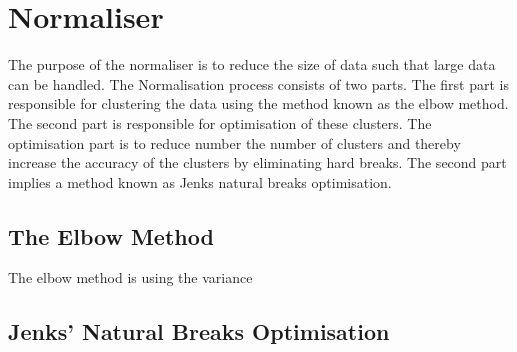 \section{Normaliser}
\label{sec:normaliser}
The purpose of the normaliser is to reduce the size of data such that large data can be handled. The Normalisation process consists of two parts. The first part is responsible for clustering the data using the method known as the elbow method. The second part is responsible for optimisation of these clusters. The optimisation part is to reduce number the number of clusters and thereby increase the accuracy of the clusters by eliminating hard breaks. The second part implies a method known as Jenks natural breaks optimisation.

\subsection{The Elbow Method}
\label{sub:elbow_method}
The elbow method is using the variance 

\subsection{Jenks' Natural Breaks Optimisation}
\label{sub:jenks} 